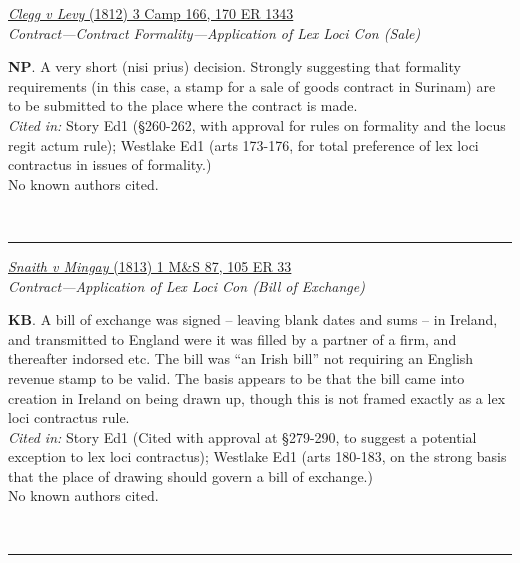 \documentclass[twoside]{article}
\begin{document}
        \begin{small}
        \begin{center}
        \href{https://heinonline.org/HOL/P?h=hein.engrep/engrk0170&i=1347}{\textit{Clegg v Levy} (1812) 3 Camp 166, 170 ER 1343} \label{55} \\ 
\textit{Contract---Contract Formality---Application of Lex Loci Con (Sale)}\\
        \end{center}
        \textbf{NP}. A very short (nisi prius) decision. Strongly suggesting that formality requirements (in this case, a stamp for a sale of goods contract in Surinam) are to be submitted to the place where the contract is made.\\\textit{Cited in: }Story Ed1 (§260-262, with approval for rules on formality and the locus regit actum rule); Westlake Ed1 (arts 173-176, for  total preference of lex loci contractus in issues of formality.)\\No known authors cited.
        \end{small}\\
        \rule{\textwidth}{0.5pt}
        

        \begin{small}
        \begin{center}
        \href{https://heinonline.org/HOL/P?h=hein.engrep/engrf0105&i=37}{\textit{Snaith v Mingay} (1813) 1 M\&S 87, 105 ER 33} \label{32} \\ 
\textit{Contract---Application of Lex Loci Con (Bill of Exchange)}\\
        \end{center}
        \textbf{KB}. A bill of exchange was signed – leaving blank dates and sums – in Ireland, and transmitted to England were it was filled by a partner of a firm, and thereafter indorsed etc. The bill was “an Irish bill” not requiring an English revenue stamp to be valid. The basis appears to be that the bill came into creation in Ireland on being drawn up, though this is not framed exactly as a lex loci contractus rule.\\\textit{Cited in: }Story Ed1 (Cited with approval at §279-290, to suggest a potential exception to lex loci contractus); Westlake Ed1 (arts 180-183, on the strong basis that the place of drawing should govern a bill of exchange.)\\No known authors cited.
        \end{small}\\
        \rule{\textwidth}{0.5pt}
        
\end{document}
